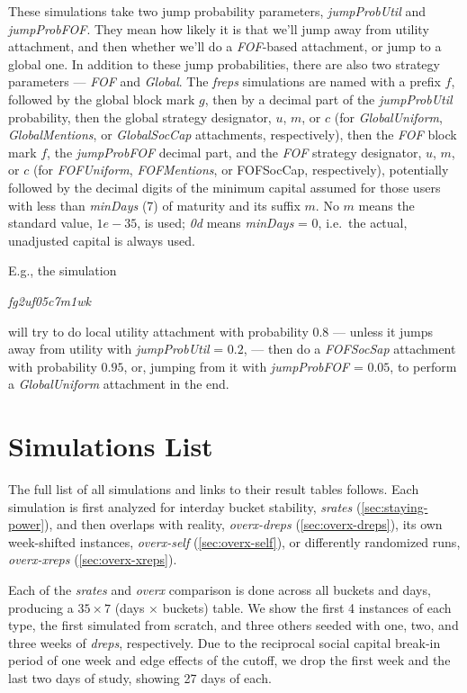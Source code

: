 \documentclass[10pt,oneside]{memoir}
\begin{document}
These simulations take two jump probability parameters, {\itshape jumpProbUtil} and {\itshape jumpProbFOF}.  They mean how likely it is that we'll jump away from utility attachment, and then whether we'll do a {\itshape FOF}-based attachment, or jump to a global one.  In addition to these jump probabilities, there are also two strategy parameters --- {\itshape FOF} and {\itshape Global}.
The {\itshape freps} simulations are named with a prefix $f$, followed by the global block mark $g$, then by a decimal part of the {\itshape jumpProbUtil} probability, then the global strategy designator, $u$, $m$, or $c$ (for {\itshape GlobalUniform}, {\itshape GlobalMentions}, or {\itshape GlobalSocCap} attachments, respectively), then the {\itshape FOF} block mark $f$, the {\itshape jumpProbFOF} decimal part, and the {\itshape FOF} strategy designator, $u$, $m$, or $c$ (for {\itshape FOFUniform}, {\itshape FOFMentions}, or FOFSocCap, respectively), potentially followed by the decimal digits of the minimum capital assumed for those users with less than {\itshape minDays} (7) of maturity and its suffix $m$.  No $m$ means the standard value, $1e-35$, is used; {\itshape 0d} means {\itshape minDays} = $0$, i.e.\ the actual, unadjusted capital is always used.


E.g., the simulation


{\itshape fg2uf05c7m1wk}


will try to do local utility attachment with probability $0.8$ --- unless it jumps away from utility with {\itshape jumpProbUtil} = $0.2$, --- then do a {\itshape FOFSocSap} attachment with probability $0.95$, or, jumping from it with {\itshape jumpProbFOF} = $0.05$, to perform a {\itshape GlobalUniform} attachment in the end.


\section{Simulations List}
\label{simulationslist}

The full list of all simulations and links to their result tables follows.  Each simulation is first analyzed for interday bucket stability, {\itshape srates} (\ref{sec:staying-power}), and then overlaps with reality, {\itshape overx-dreps} (\ref{sec:overx-dreps}), its own week-shifted instances, {\itshape overx-self} (\ref{sec:overx-self}), or differently randomized runs, {\itshape overx-xreps} (\ref{sec:overx-xreps}).


Each of the {\itshape srates} and {\itshape overx} comparison is done across all buckets and days, producing a $35 \times 7$ (days $\times$ buckets) table.  We show the first 4 instances of each type, the first simulated from scratch, and three others seeded with one, two, and three weeks of {\itshape dreps}, respectively.  Due to the reciprocal social capital break-in period of one week and edge effects of the cutoff, we drop the first week and the last two days of study, showing 27 days of each.
\end{document}
